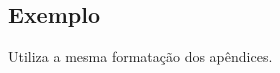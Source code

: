 
\begin{anexosenv}
\partanexos   %
\chapter{Exemplo}

Utiliza a mesma formatação dos apêndices.

\end{anexosenv}
